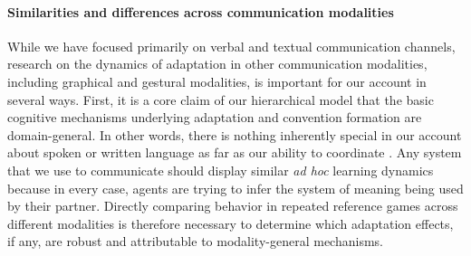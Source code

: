 \paragraph{Similarities and differences across communication modalities}


While we have focused primarily on verbal and textual communication channels, research on the dynamics of adaptation in other communication modalities, including graphical \cite{GarrodFayLeeOberlanderMacLeod07_GraphicalSymbolSystems,TheisenEtAl10_SystematicityArbitrariness,hawkins2019disentangling} and gestural \cite{FayListerEllisonGoldinMeadow13_GestureBeatsVocalization,bohn2019young}  modalities, is important for our account in several ways.
First, it is a core claim of our hierarchical model that the basic cognitive mechanisms underlying adaptation and convention formation are domain-general.
In other words, there is nothing inherently special in our account about spoken or written language as far as our ability to coordinate . 
Any system that we use to communicate should display similar \emph{ad hoc} learning dynamics because in every case, agents are trying to infer the system of meaning being used by their partner.
Directly comparing behavior in repeated reference games across different modalities is therefore necessary to determine which adaptation effects, if any, are robust and attributable to modality-general mechanisms.

